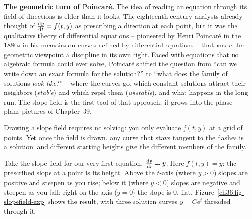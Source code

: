 \begin{connectionbox}
\textbf{The geometric turn of Poincar\'e.}
The idea of reading an equation through its field of directions is older than it looks. The eighteenth-century analysts already thought of $\frac{\mathrm{d} y}{\mathrm{d} t}=f(t,y)$ as prescribing a direction at each point, but it was the qualitative theory of differential equations -- pioneered by Henri Poincar\'e in the 1880s in his memoirs on curves defined by differential equations -- that made the geometric viewpoint a discipline in its own right. Faced with equations that no algebraic formula could ever solve, Poincar\'e shifted the question from ``can we write down an exact formula for the solution?'' to ``what does the family of solutions \emph{look like}?'' -- where the curves go, which constant solutions attract their neighbors (\emph{stable}) and which repel them (\emph{unstable}), and what happens in the long run. The slope field is the first tool of that approach; it grows into the phase-plane pictures of Chapter~39.
\end{connectionbox}

\begin{intuitionbox}
Drawing a slope field requires no solving: you only evaluate $f(t,y)$ at a grid of points. Yet once the field is drawn, any curve that stays tangent to the dashes is a solution, and different starting heights give the different members of the family.
\end{intuitionbox}

Take the slope field for our very first equation, $\frac{\mathrm{d} y}{\mathrm{d} t} = y$. Here $f(t,y) = y$: the prescribed slope at a point is its height. Above the $t$-axis (where $y>0$) slopes are positive and steepen as you rise; below it (where $y<0$) slopes are negative and steepen as you fall; right on the axis ($y=0$) the slope is $0$, flat. Figure~\ref{ch36:fig-slopefield-exp} shows the result, with three solution curves $y = Ce^t$ threaded through it.

